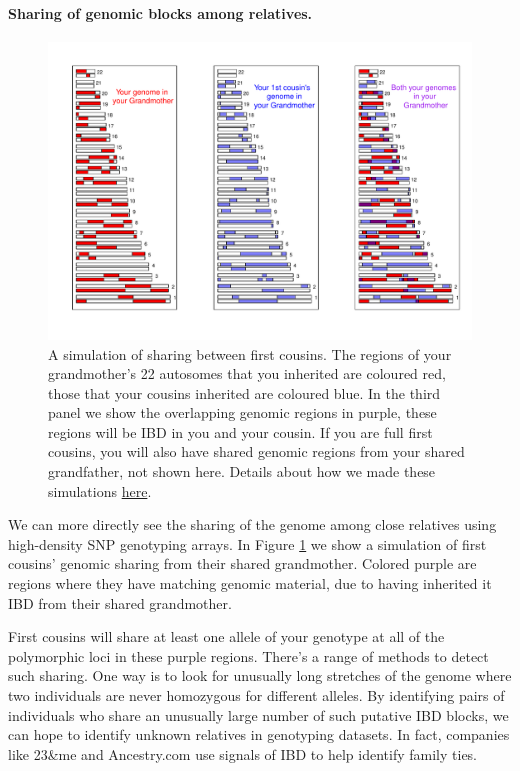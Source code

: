 {{\paragraph{Sharing of genomic blocks among relatives.}
\begin{figure}
\begin{center}
\includegraphics[width= \textwidth]{figures/sharing_relatives/First_cousin_overlap.pdf}
\end{center}
\caption[]{A simulation of sharing between first cousins. The regions of your grandmother's 22 autosomes that you inherited are
coloured red, those that your cousins inherited are coloured blue. In the third panel we show the overlapping genomic regions in purple, these regions will be IBD in you and your cousin. If you are full first cousins, you will also have shared genomic regions from your shared grandfather, not shown here. Details about how we made these simulations \href{https://gcbias.org/2013/12/02/how-many-genomic-blocks-do-you-share-with-a-cousin/}{here}.
} \label{fig:first_cousin_IBD}
\end{figure}
We can more directly see the sharing of the genome among close
relatives using high-density SNP genotyping arrays. In Figure
\ref{fig:first_cousin_IBD} we show a simulation of first cousins'
genomic sharing from their shared grandmother. Colored purple are
regions where they have matching genomic material, due to having
inherited it IBD from their shared grandmother.


First cousins will share at least one allele of your genotype at all of the polymorphic loci in these purple regions. There's a range of methods to detect such sharing. One way is to look for unusually long stretches of the genome where two individuals are never homozygous for different alleles. By identifying pairs of individuals who share an unusually large number of such putative IBD blocks, we can hope to identify unknown relatives in genotyping datasets. In fact, companies like 23\&me and Ancestry.com use signals of IBD to help identify family ties.

}}
